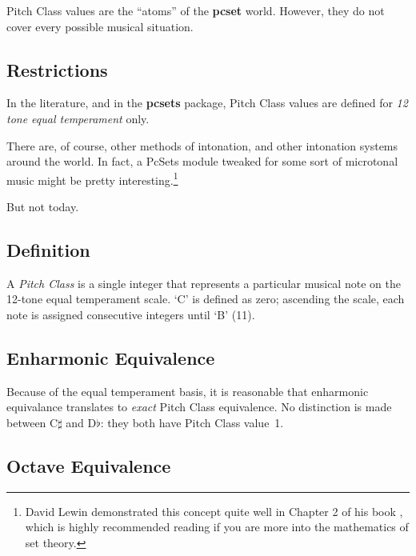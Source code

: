 \documentclass[letterpaper,12pt,oneside]{book}
\begin{document}
Pitch Class values are the ``atoms'' of the {\bf pcset} world.
However, they do not cover every possible musical situation.


\subsection{Restrictions}

In the literature, and in the {\bf pcsets} package, Pitch Class values
are defined for {\em 12 tone equal temperament} only. 

There are, of course, other methods of intonation, and other
intonation systems around the world. In fact, a PcSets module
tweaked for some sort of microtonal music might be
pretty interesting.\footnote{ David Lewin demonstrated this concept
quite well in Chapter 2 of his book \cite{lewin}, which is highly
recommended reading if you are more into the mathematics of set
theory. }

But not today.


\subsection{Definition}

A {\em Pitch Class} is a single integer that represents a particular
musical note on the 12-tone equal temperament scale. `C' is defined as
zero; ascending the scale, each note is
assigned consecutive integers until `B' (11).


\subsection{Enharmonic Equivalence}

Because of the equal temperament basis, it is reasonable
that enharmonic equivalance translates to {\em exact} Pitch
Class equivalence. 
 No distinction is made between
C$\sharp$ and D$\flat$: they both have Pitch Class value~1.


\subsection{Octave Equivalence}
\end{document}
